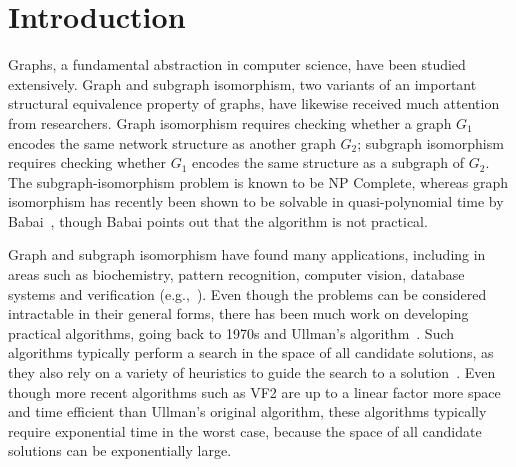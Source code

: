 

%
\section*{Introduction}
%
Graphs, a fundamental abstraction in computer science, have been
studied extensively.
%
Graph and subgraph isomorphism, two variants of an important
structural equivalence property of graphs, have likewise received much
attention from researchers.
%
Graph isomorphism requires checking whether a graph $G_1$ encodes the
same network structure as another graph $G_2$; subgraph isomorphism
requires checking whether $G_1$ encodes the same structure as a
subgraph of $G_2$.
%
The subgraph-isomorphism problem is known to be NP Complete, whereas
graph isomorphism has recently been shown to be solvable in
quasi-polynomial time by Babai~\cite{babai}, though Babai points out
that the algorithm is not practical.

Graph and subgraph isomorphism have found many applications, including
in areas such as biochemistry, pattern recognition, computer vision,
database systems and verification
(e.g.,~\cite{patternwithsub1,characterrecognition,subgraphsindatabases,subgraphsinchemistry}).
%
Even though the problems can be considered intractable in their
general forms, there has been much work on developing practical
algorithms, going back to 1970s and Ullman's algorithm~\cite{ullman}.
%
Such algorithms typically perform a search in the space of all
candidate solutions, as they also rely on a variety of heuristics to
guide the search to a solution~\cite{ullman, VF2}.
%
Even though more recent algorithms such as VF2 are up to a linear
factor more space and time efficient than Ullman's original algorithm,
these algorithms typically require exponential time in the worst case,
because the space of all candidate solutions can be exponentially
large.

